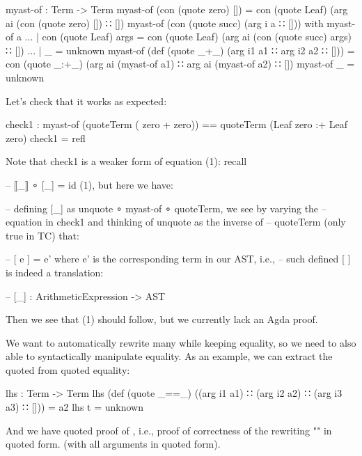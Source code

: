 \documentclass{article}
\begin{document}
\begin{code}
myast-of : Term -> Term
myast-of (con (quote zero) []) = con (quote Leaf) (arg ai (con (quote zero) []) ∷ [])
myast-of (con (quote succ) (arg i a ∷ [])) with myast-of a
... | con (quote Leaf) args = con (quote Leaf) (arg ai (con (quote succ) args) ∷ [])
... | _ = unknown
myast-of (def (quote _+_) (arg i1 a1 ∷ arg i2 a2 ∷ [])) =
  con (quote _:+_) (arg ai (myast-of a1) ∷ arg ai (myast-of a2) ∷ [])
myast-of _ = unknown
\end{code}

Let's check that it works as expected:

\begin{code}
check1 : myast-of (quoteTerm ( zero + zero)) == quoteTerm (Leaf zero :+ Leaf zero)
check1 = refl
\end{code}

Note that check1 is a weaker form of equation (1): recall

\begin{code}
-- ⟦_⟧ ∘ [_] = id (1), but here we have:

-- defining [_] as unquote ∘ myast-of ∘ quoteTerm, we see by varying the
-- equation in check1 and thinking of unquote as the inverse of
-- quoteTerm (only true in TC) that:

-- [ e ] = e' where e' is the corresponding term in our AST, i.e.,
-- such defined [ ] is indeed a translation:

-- [_] : ArithmeticExpression -> AST
\end{code}

Then we see that (1) should follow, but we currently lack an Agda proof.

We want to automatically rewrite many  \AgdaOperator{\AgdaFunction{+}}  while keeping equality, so we need to also able to syntactically manipulate equality. As an example, we can extract the quoted  from quoted equality:

\begin{code}
lhs : Term -> Term
lhs (def (quote _==_) ((arg i1 a1) ∷ (arg i2 a2) ∷ (arg i3 a3) ∷ [])) = a2 
lhs t = unknown
\end{code}

And we have quoted proof of    \AgdaOperator{\AgdaDatatype{==}}     , i.e., proof of correctness of the rewriting "" in quoted form. (with all arguments in quoted form).  %
\end{document}
